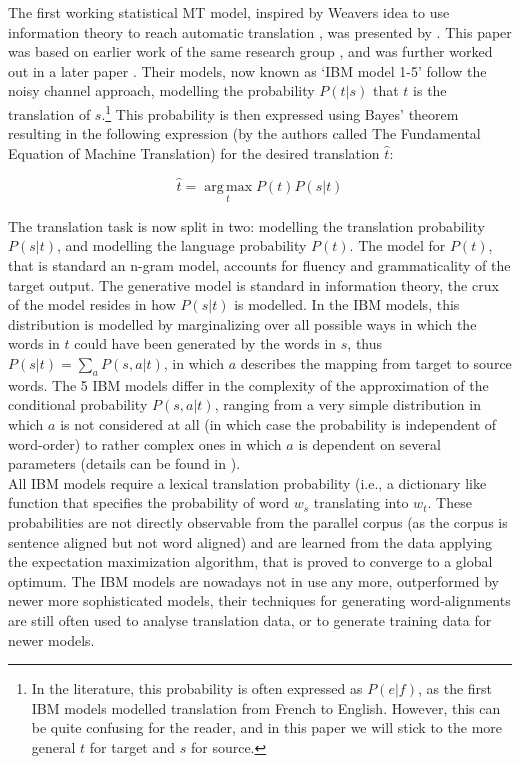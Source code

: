 \documentclass{report}
\theoremstyle{definition}
\theoremstyle{plain}
\begin{document}
The first working statistical MT model, inspired by  Weavers idea to use information theory to reach automatic translation \citep{weaver1955translation}, was presented by \cite{brown1990statistical}. This paper was based on earlier work of the same research group \citep{brown1988statistical}, and was further worked out in a later paper \citep{brown1993mathematics}. Their models, now known as `IBM model 1-5' follow the noisy channel approach, modelling the probability $P(t|s)$ that $t$ is the translation of $s$.\footnote{In the literature, this probability is often expressed as $P(e|f)$, as the first IBM models modelled translation from French to English. However, this can be quite confusing for the reader, and in this paper we will stick to the more general $t$ for target and $s$ for source.} This probability is then expressed using Bayes' theorem resulting in the following expression (by the authors called The Fundamental Equation of Machine Translation) for the desired translation $\hat{t}$:

\[
\hat{t} = \operatorname*{arg\,max}_t P(t)P(s|t)
\]

The translation task is now split in two: modelling the translation probability $P(s|t)$, and modelling the language probability $P(t)$. The model for $P(t)$, that is standard an n-gram model, accounts for fluency and grammaticality of the target output. The generative model is standard in information theory, the crux of the model resides in how $P(s|t)$ is modelled. In the IBM models, this distribution is modelled by marginalizing over all possible ways in which the words in $t$ could have been generated by the words in $s$, thus $P(s|t) = \sum_a P(s,a|t)$, in which $a$ describes the mapping from target to source words. The 5 IBM models differ in the complexity of the approximation of the conditional probability $P(s,a|t)$, ranging from a very simple distribution in which $a$ is not considered at all (in which case the probability is independent of word-order) to rather complex ones in which $a$ is dependent on several parameters (details can be found in \cite{brown1993mathematics}).\\
All IBM models require a lexical translation probability (i.e., a dictionary like function that specifies the probability of word $w_s$ translating into $w_t$. These probabilities are not directly observable from the parallel corpus (as the corpus is sentence aligned but not word aligned) and are learned from the data applying the expectation maximization algorithm, that is proved to converge to a global optimum. The IBM models are nowadays not in use any more, outperformed by newer more sophisticated models, their techniques for generating word-alignments are still often used to analyse translation data, or to generate training data for newer models.
\end{document}
